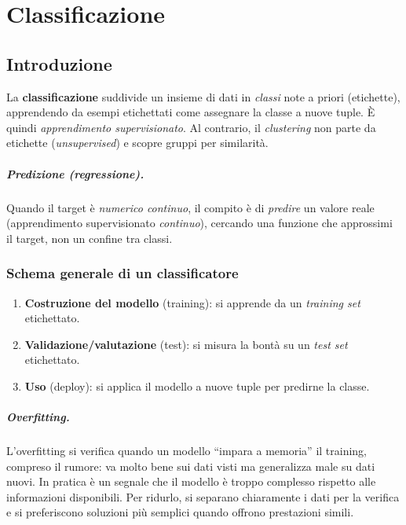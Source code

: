 \chapter{Classificazione}\label{ch:classificazione}

\section{Introduzione}\label{sec:intro-class}
La \textbf{classificazione} suddivide un insieme di dati in \emph{classi} note a priori (etichette),
apprendendo da esempi etichettati come assegnare la classe a nuove tuple. È quindi
\emph{apprendimento supervisionato}. Al contrario, il \emph{clustering} non parte da etichette
(\emph{unsupervised}) e scopre gruppi per similarità.

\paragraph{Predizione (regressione).}
Quando il target è \emph{numerico continuo}, il compito è di \emph{predire} un valore reale
(apprendimento supervisionato \emph{continuo}), cercando una funzione che approssimi
il target, non un confine tra classi.

\subsection{Schema generale di un classificatore}\label{subsec:schema-class}
\begin{enumerate}
  \item \textbf{Costruzione del modello} (training): si apprende da un \emph{training set} etichettato.
  \item \textbf{Validazione/valutazione} (test): si misura la bontà su un \emph{test set} etichettato.
  \item \textbf{Uso} (deploy): si applica il modello a nuove tuple per predirne la classe.
\end{enumerate}

\paragraph{Overfitting.}
L’overfitting si verifica quando un modello “impara a memoria” il training, compreso il rumore: va molto bene sui dati visti ma generalizza male su dati nuovi. In pratica è un segnale che il modello è troppo complesso rispetto alle informazioni disponibili. Per ridurlo, si separano chiaramente i dati per la verifica e si preferiscono soluzioni più semplici quando offrono prestazioni simili.

